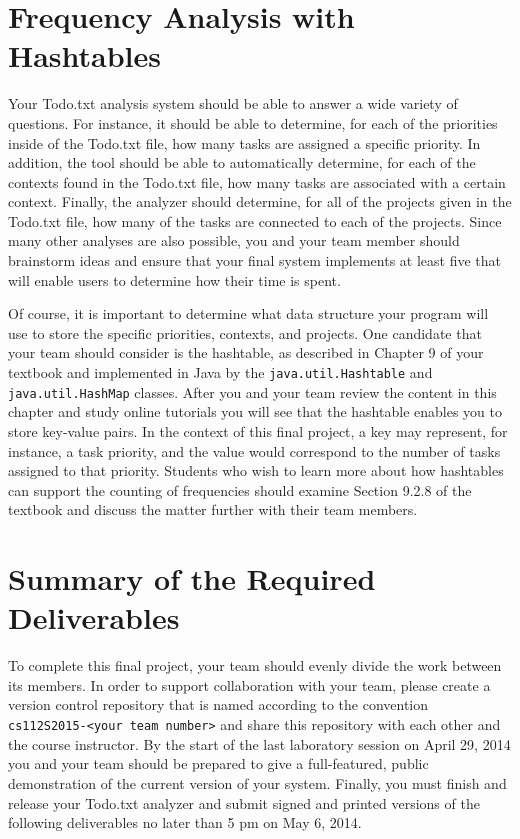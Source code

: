 \section*{Frequency Analysis with Hashtables}

  Your Todo.txt analysis system should be able to answer a wide variety of questions. For instance, it should be able to
  determine, for each of the priorities inside of the Todo.txt file, how many tasks are assigned a specific priority.
  In addition, the tool should be able to automatically determine, for each of the contexts found in the Todo.txt file,
  how many tasks are associated with a certain context. Finally, the analyzer should determine, for all of the projects
  given in the Todo.txt file, how many of the tasks are connected to each of the projects. Since many other analyses are
  also possible, you and your team member should brainstorm ideas and ensure that your final system implements at least
  five that will enable users to determine how their time is spent.

  Of course, it is important to determine what data structure your program will use to store the specific priorities,
  contexts, and projects.  One candidate that your team should consider is the hashtable, as described in Chapter 9 of
  your textbook and implemented in Java by the {\tt java.util.Hashtable} and {\tt java.util.HashMap} classes. After you
  and your team review the content in this chapter and study online tutorials you will see that the hashtable enables
  you to store key-value pairs.  In the context of this final project, a key may represent, for instance, a task
  priority, and the value would correspond to the number of tasks assigned to that priority. Students who wish to
  learn more about how hashtables can support the counting of frequencies should examine Section 9.2.8 of the textbook
  and discuss the matter further with their team members.


\section*{Summary of the Required Deliverables}

 To complete this final project, your team should evenly divide the work between its members.  In order to support
 collaboration with your team, please create a version control repository that is named according to the convention {\tt
 cs112S2015-<your team number>} and share this repository with each other and the course instructor. By the start of the
 last laboratory session on April 29, 2014 you and your team should be prepared to give a full-featured, public
 demonstration of the current version of your system. Finally, you must finish and release your Todo.txt analyzer and
 submit signed and printed versions of the following deliverables no later than 5 pm on May 6, 2014.


